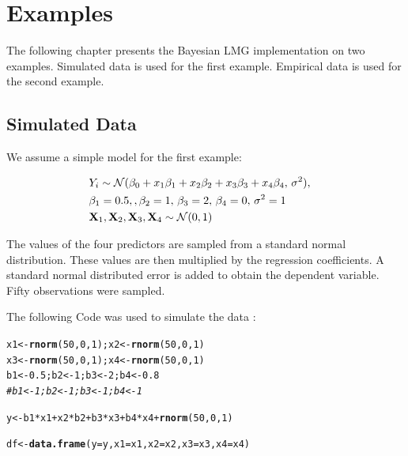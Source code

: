 \documentclass[11pt,a4paper,twoside]{book}
\makeatletter
\newcommand{\hlnum}[1]{\textcolor[rgb]{0.686,0.059,0.569}{#1}}%
\newcommand{\hlcom}[1]{\textcolor[rgb]{0.678,0.584,0.686}{\textit{#1}}}%
\newcommand{\hlopt}[1]{\textcolor[rgb]{0,0,0}{#1}}%
\newcommand{\hlstd}[1]{\textcolor[rgb]{0.345,0.345,0.345}{#1}}%
\newcommand{\hlkwb}[1]{\textcolor[rgb]{0.69,0.353,0.396}{#1}}%
\newcommand{\hlkwc}[1]{\textcolor[rgb]{0.333,0.667,0.333}{#1}}%
\newcommand{\hlkwd}[1]{\textcolor[rgb]{0.737,0.353,0.396}{\textbf{#1}}}%
\newenvironment{kframe}{%
 \def\at@end@of@kframe{}%
 \ifinner\ifhmode%
  \def\at@end@of@kframe{\end{minipage}}%
  \begin{minipage}{\columnwidth}%
 \fi\fi%
 \def\FrameCommand##1{\hskip\@totalleftmargin \hskip-\fboxsep
 \colorbox{shadecolor}{##1}\hskip-\fboxsep
     \hskip-\linewidth \hskip-\@totalleftmargin \hskip\columnwidth}%
 \MakeFramed {\advance\hsize-\width
   \@totalleftmargin\z@ \linewidth\hsize
   \@setminipage}}%
 {\par\unskip\endMakeFramed%
 \at@end@of@kframe}
\newenvironment{knitrout}{}{} %
\makeatother
\begin{document}






\chapter{Examples}

The following chapter presents the Bayesian LMG implementation on two examples. Simulated data is used for the first example. Empirical data is used for the second example.

\section{Simulated Data}

We assume a simple model for the first example: 

\begin{align*} 
&Y_{i} \sim \mathcal{N}(\beta_{0}+x_{1} \beta_{1}+x_{2} \beta_{2}+x_{3} \beta_{3}+x_{4} \beta_{4}, \, \sigma^2),& \\ & \beta_{1} = 0.5, , \beta_{2} = 1, \, \beta_{3} = 2 , \, \beta_{4}=0, \, \sigma^2 = 1 & \\ & {\mathbf{X}}_{1}, {\mathbf{X}}_{2},{\mathbf{X}}_{3},{\mathbf{X}}_{4} \sim \mathcal{N}(0, 1) 
\end{align*} 

The values of the four predictors are sampled from a standard normal distribution. These values are then multiplied by the regression coefficients. A standard normal distributed error is added to obtain the dependent variable. Fifty observations were sampled.

The following Code was used to simulate the data :

\begin{knitrout}
\color{fgcolor}\begin{kframe}
\begin{alltt}
\hlstd{x1} \hlkwb{<-} \hlkwd{rnorm}\hlstd{(}\hlnum{50}\hlstd{,} \hlnum{0}\hlstd{,} \hlnum{1}\hlstd{); x2} \hlkwb{<-} \hlkwd{rnorm}\hlstd{(}\hlnum{50}\hlstd{,} \hlnum{0}\hlstd{,} \hlnum{1}\hlstd{)}
\hlstd{x3} \hlkwb{<-} \hlkwd{rnorm}\hlstd{(}\hlnum{50}\hlstd{,} \hlnum{0}\hlstd{,} \hlnum{1}\hlstd{); x4} \hlkwb{<-} \hlkwd{rnorm}\hlstd{(}\hlnum{50}\hlstd{,} \hlnum{0}\hlstd{,} \hlnum{1}\hlstd{)}
\hlstd{b1} \hlkwb{<-} \hlnum{0.5}\hlstd{; b2} \hlkwb{<-} \hlnum{1}\hlstd{; b3} \hlkwb{<-} \hlnum{2}\hlstd{; b4} \hlkwb{<-} \hlnum{0.8}
\hlcom{#b1 <- 1; b2 <- 1; b3 <- 1; b4 <- 1}

\hlstd{y} \hlkwb{<-} \hlstd{b1}\hlopt{*}\hlstd{x1} \hlopt{+} \hlstd{x2}\hlopt{*}\hlstd{b2} \hlopt{+} \hlstd{b3}\hlopt{*}\hlstd{x3} \hlopt{+} \hlstd{b4}\hlopt{*}\hlstd{x4} \hlopt{+} \hlkwd{rnorm}\hlstd{(}\hlnum{50}\hlstd{,} \hlnum{0}\hlstd{,} \hlnum{1}\hlstd{)}

\hlstd{df} \hlkwb{<-} \hlkwd{data.frame}\hlstd{(}\hlkwc{y} \hlstd{= y,} \hlkwc{x1} \hlstd{= x1,} \hlkwc{x2} \hlstd{= x2,} \hlkwc{x3} \hlstd{= x3,} \hlkwc{x4} \hlstd{= x4)}
\end{alltt}
\end{kframe}
\end{knitrout}
\end{document}
